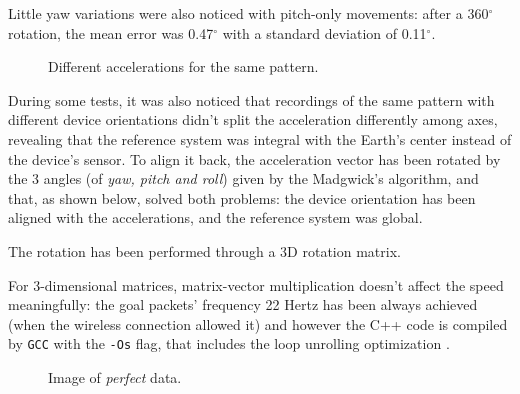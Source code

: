 Little yaw variations were also noticed with pitch-only movements: after a 360$^{\circ}$ rotation, the mean error was 0.47$^{\circ}$ with a standard deviation of 0.11$^{\circ}$.

\begin{center}
	\begin{figure}[ht]
		\caption{Different accelerations for the same pattern.}
	\end{figure}
\end{center}

During some tests, it was also noticed that recordings of the same pattern with different device orientations didn't split the acceleration differently among axes, revealing that the reference system was integral with the Earth's center instead of the device's sensor. To align it back, the acceleration vector has been rotated by the 3 angles (of \textit{yaw, pitch and roll}) given by the Madgwick's algorithm, and that, as shown below, solved both problems: the device orientation has been aligned with the accelerations, and the reference system was global.
\bigbreak

The rotation has been performed through a 3D rotation matrix.
\bigbreak

For 3-dimensional matrices, matrix-vector multiplication doesn't affect the speed meaningfully: the goal packets' frequency 22 Hertz has been always achieved (when the wireless connection allowed it) and however the C++ code is compiled by \texttt{GCC} with the \texttt{-Os} flag, that includes the loop unrolling optimization \cite{UsingGCC}.

\begin{center}
	\begin{figure}[ht]
		\caption{Image of \textit{perfect} data.}
	\end{figure}
\end{center}

